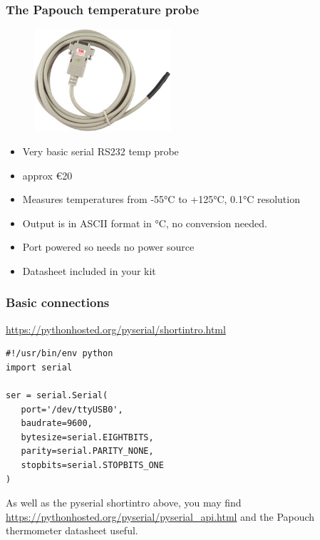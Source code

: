 \documentclass[aspectratio=1610,9pt]{beamer} %
\begin{document}
\begin{frame}
\frametitle{The Papouch temperature probe}

\begin{figure}
\vspace{-3cm}
\includegraphics[width=0.45\textwidth]{papouchprobe.jpeg}
\end{figure}
\par
\begin{minipage}{0.45\textwidth}
\begin{itemize}
\itemsep1pt\parskip0pt
\item
  Very basic serial RS232 temp probe
\item
  approx €20
\item
  Measures temperatures from -55°C to +125°C, 0.1°C resolution
\item
  Output is in ASCII format in °C, no conversion needed.
\item
  Port powered so needs no power source
\item
  Datasheet included in your kit
\end{itemize}
\end{minipage}

\end{frame}
\begin{frame}[fragile=singleslide]
\frametitle{Basic connections}

\href{https://pythonhosted.org/pyserial/shortintro.html}{https://pythonhosted.org/pyserial/shortintro.html}

\begin{verbatim}
#!/usr/bin/env python
import serial

ser = serial.Serial(
   port='/dev/ttyUSB0',
   baudrate=9600,
   bytesize=serial.EIGHTBITS,
   parity=serial.PARITY_NONE,
   stopbits=serial.STOPBITS_ONE
)
\end{verbatim}

As well as the pyserial shortintro above, you may find
\url{https://pythonhosted.org/pyserial/pyserial_api.html}
and the Papouch thermometer datasheet useful.

\end{frame}
\end{document}
